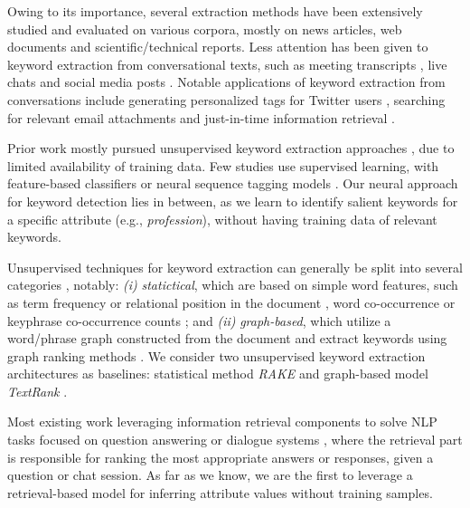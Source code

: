 Owing to its importance, several extraction methods have been extensively studied and evaluated on various corpora, mostly on news articles, web documents and scientific/technical reports. Less attention has been given to keyword extraction from conversational texts, such as meeting transcripts \cite{liu-etal-2009-unsupervised,7045531}, live chats \cite{kim-baldwin-2012-extracting} and social media posts \cite{Zhao:2011:TKE:2002472.2002521,wu-etal-2010-automatic-generation,zhang-etal-2016-keyphrase}.
Notable applications of keyword extraction from conversations include 
generating personalized tags for Twitter users \cite{wu-etal-2010-automatic-generation}, searching for relevant email attachments \cite{van2017reply} and just-in-time information retrieval \cite{7045531}.

Prior work 
mostly
pursued unsupervised keyword extraction approaches \cite{mihalcea2004textrank, rose2010automatic},
due to limited availability of
training data. Few studies use supervised learning, with feature-based classifiers \cite{kim-baldwin-2012-extracting} 
or neural sequence tagging models \cite{zhang-etal-2016-keyphrase}. 
Our neural approach for keyword detection 
lies in between, as we 
learn to identify 
salient keywords for a specific attribute (e.g., \emph{profession}),
without having training data of relevant keywords.

Unsupervised techniques for keyword extraction can generally be split into several categories \cite{hasan-ng-2014-automatic}, notably: \textit{(i)} \textit{statictical}, which are based on simple word features, such as term frequency or relational position in the document \cite{ramos2003using, campos2018yake}, word co-occurrence \cite{matsuo2004keyword} or keyphrase co-occurrence counts \cite{rose2010automatic}; and \textit{(ii)} \textit{graph-based}, which utilize a word/phrase graph constructed from the document and extract keywords using graph ranking methods \cite{mihalcea2004textrank, bougouin:hal-00917969}. We consider two unsupervised keyword extraction architectures as baselines: statistical method \textit{RAKE} \cite{rose2010automatic} and graph-based model \textit{TextRank} \cite{mihalcea2004textrank}.


Most existing work leveraging information retrieval components to solve NLP tasks focused on question answering  %
\cite{kratzwald-feuerriegel-2018-adaptive,wang2018r, guu2020realm}
or dialogue systems 
\cite{feng-etal-2019-learning,Luo2019Personalized},
where the retrieval part is responsible for ranking the most appropriate answers or responses, given a question or chat session. As far as we know, we are the first to leverage a retrieval-based 
model for inferring 
attribute values without training samples.


